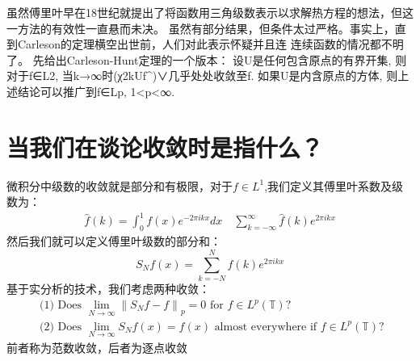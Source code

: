 \documentclass[12pt]{article}
\begin{document}
    虽然傅里叶早在18世纪就提出了将函数用三角级数表示以求解热方程的想法，但这一方法的有效性一直悬而未决。
虽然有部分结果，但条件太过严格。事实上，直到Carleson的定理横空出世前，人们对此表示怀疑并且连
连续函数的情况都不明了。
    先给出Carleson-Hunt定理的一个版本：
    设U是任何包含原点的有界开集, 则对于f∈L2, 当k→∞时(χ2kUf^)∨几乎处处收敛至f. 如果U是内含原点的方体, 则上述结论可以推广到f∈Lp, 1<p<∞.

\section{当我们在谈论收敛时是指什么？}
    微积分中级数的收敛就是部分和有极限，对于$f\in L^1$,我们定义其傅里叶系数及级数为：
    \begin{eqnarray*}
\hat{f}(k)=\int_{0}^{1} f(x) e^{-2 \pi i k x} d x
\quad \sum_{k=-\infty}^{\infty} \hat{f}(k) e^{2 \pi i k x}
    \end{eqnarray*}
    然后我们就可以定义傅里叶级数的部分和：
    \begin{equation}
S_{N} f(x)=\sum_{k=-N}^{N} \hat{f}(k) e^{2 \pi i k x}
\end{equation}
    基于实分析的技术，我们考虑两种收敛：
    \begin{equation}
\begin{array}{l}{\text { (1) Does } \lim _{N \rightarrow \infty}\left\|S_{N} f-f\right\|_{p}=0 \text { for } f \in L^{p}(\mathbb{T}) ?} \\ {\text { (2) Does } \lim _{N \rightarrow \infty} S_{N} f(x)=f(x) \text { almost everywhere if } f \in L^{p}(\mathbb{T}) ?}\end{array}
\end{equation}
前者称为范数收敛，后者为逐点收敛
\end{document}
